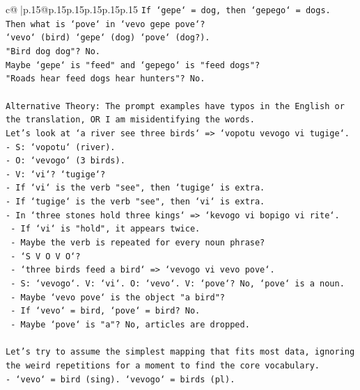 \documentclass{article}
\begin{document}
{\begin{supertabular}{c@{$\;$}|p{.15\linewidth}@{}p{.15\linewidth}p{.15\linewidth}p{.15\linewidth}p{.15\linewidth}p{.15\linewidth}}
{{{\texttt{If `gepe` = dog, then `gepego` = dogs.} \\
\texttt{Then what is `pove` in `vevo gepe pove`?} \\
\texttt{`vevo` (bird) `gepe` (dog) `pove` (dog?).} \\
\texttt{"Bird dog dog"? No.} \\
\texttt{Maybe `gepe` is "feed" and `gepego` is "feed dogs"?} \\
\texttt{"Roads hear feed dogs hear hunters"? No.} \\
\\ 
\texttt{Alternative Theory: The prompt examples have typos in the English or the translation, OR I am misidentifying the words.} \\
\texttt{Let's look at `a river see three birds` => `vopotu vevogo vi tugige`.} \\
\texttt{{-} S: `vopotu` (river).} \\
\texttt{{-} O: `vevogo` (3 birds).} \\
\texttt{{-} V: `vi`? `tugige`?} \\
\texttt{{-} If `vi` is the verb "see", then `tugige` is extra.} \\
\texttt{{-} If `tugige` is the verb "see", then `vi` is extra.} \\
\texttt{{-} In `three stones hold three kings` => `kevogo vi bopigo vi rite`.} \\
\texttt{  {-} If `vi` is "hold", it appears twice.} \\
\texttt{  {-} Maybe the verb is repeated for every noun phrase?} \\
\texttt{  {-} `S V O V O`?} \\
\texttt{  {-} `three birds feed a bird` => `vevogo vi vevo pove`.} \\
\texttt{    {-} S: `vevogo`. V: `vi`. O: `vevo`. V: `pove`? No, `pove` is a noun.} \\
\texttt{    {-} Maybe `vevo pove` is the object "a bird"?} \\
\texttt{    {-} If `vevo` = bird, `pove` = bird? No.} \\
\texttt{    {-} Maybe `pove` is "a"? No, articles are dropped.} \\
\\ 
\texttt{Let's try to assume the simplest mapping that fits most data, ignoring the weird repetitions for a moment to find the core vocabulary.} \\
\texttt{{-} `vevo` = bird (sing). `vevogo` = birds (pl).} \\
}}}
\end{supertabular}}
\end{document}
